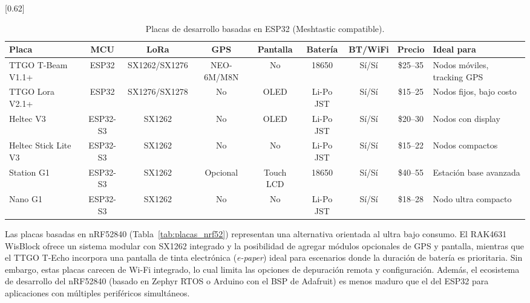 \begin{table}[H]
\begin{center}
\caption{Placas de desarrollo basadas en ESP32 (Meshtastic compatible).}
\scalebox{0.62}[0.62]{
\begin{tabular}{| l | c | c | c | c | c | c | c | l |}
\hline
 \textbf{Placa} & \textbf{MCU} & \textbf{LoRa} & \textbf{GPS} & \textbf{Pantalla} & \textbf{Batería} & \textbf{BT/WiFi} & \textbf{Precio} & \textbf{Ideal para} \\
\hline
\hline
 TTGO T-Beam V1.1+ & ESP32 & SX1262/SX1276 & NEO-6M/M8N & No & 18650 & Sí/Sí & \$25--35 & Nodos móviles, tracking GPS \\
 TTGO Lora V2.1+ & ESP32 & SX1276/SX1278 & No & OLED & Li-Po JST & Sí/Sí & \$15--25 & Nodos fijos, bajo costo \\
 Heltec V3 & ESP32-S3 & SX1262 & No & OLED & Li-Po JST & Sí/Sí & \$20--30 & Nodos con display \\
 Heltec Stick Lite V3 & ESP32-S3 & SX1262 & No & No & Li-Po JST & Sí/Sí & \$15--22 & Nodos compactos \\
 Station G1 & ESP32-S3 & SX1262 & Opcional & Touch LCD & 18650 & Sí/Sí & \$40--55 & Estación base avanzada \\
 Nano G1 & ESP32-S3 & SX1262 & No & No & Li-Po JST & Sí/Sí & \$18--28 & Nodo ultra compacto \\
\hline
\end{tabular}}
\label{tab:placas_esp32}
\end{center}
\end{table}

Las placas basadas en nRF52840 (Tabla~\ref{tab:placas_nrf52}) representan una alternativa orientada al ultra bajo consumo. El RAK4631 WisBlock ofrece un sistema modular con SX1262 integrado y la posibilidad de agregar módulos opcionales de GPS y pantalla, mientras que el TTGO T-Echo incorpora una pantalla de tinta electrónica (\textit{e-paper}) ideal para escenarios donde la duración de batería es prioritaria. Sin embargo, estas placas carecen de Wi-Fi integrado, lo cual limita las opciones de depuración remota y configuración. Además, el ecosistema de desarrollo del nRF52840 (basado en Zephyr RTOS o Arduino con el BSP de Adafruit) es menos maduro que el del ESP32 para aplicaciones con múltiples periféricos simultáneos.

